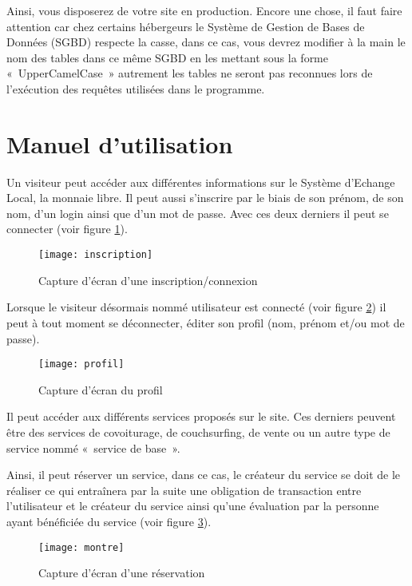 Ainsi, vous disposerez de votre site en production.
Encore une chose, il faut faire attention car chez certains hébergeurs le Système de Gestion de Bases de Données (SGBD) respecte la casse, dans ce cas, vous devrez modifier à la main le nom des tables dans ce même SGBD en les mettant sous la forme «~UpperCamelCase~» autrement les tables ne seront pas reconnues lors de l'exécution des requêtes utilisées dans le programme.

\section{Manuel d'utilisation}

Un visiteur peut accéder aux différentes informations sur le Système d'Echange Local, la monnaie libre. Il peut aussi s'inscrire par le biais de son prénom, de son nom, d'un login ainsi que d'un mot de passe. Avec ces deux derniers il peut se connecter (voir figure \ref{fig:Inscription}).

\begin{figure}[h!]
\centering
\texttt{[image: inscription]}
\caption{Capture d'écran d'une inscription/connexion}
\label{fig:Inscription}
\end{figure}

Lorsque le visiteur désormais nommé utilisateur est connecté (voir figure \ref{fig:Profil}) il peut à tout moment se déconnecter, éditer son profil (nom, prénom et/ou mot de passe).

\begin{figure}[h!]
\centering
\texttt{[image: profil]}
\caption{Capture d'écran du profil}
\label{fig:Profil}
\end{figure}

Il peut accéder aux différents services proposés sur le site. 
Ces derniers peuvent être des services de covoiturage, de couchsurfing, de vente ou un autre type de service nommé «~service de base~».

Ainsi, il peut réserver un service, dans ce cas, le créateur du service se doit de le réaliser ce qui entraînera par la suite une obligation de transaction entre l'utilisateur et le créateur du service ainsi qu'une évaluation par la personne ayant bénéficiée du service (voir figure \ref{fig:Montre}).

\begin{figure}[h!]
\centering
\texttt{[image: montre]}
\caption{Capture d'écran d'une réservation}
\label{fig:Montre}
\end{figure}

